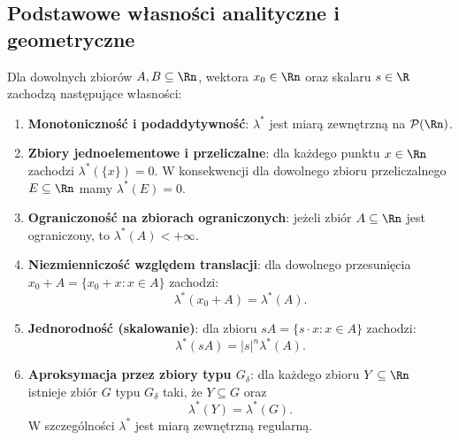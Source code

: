 \subsection{Podstawowe własności analityczne i geometryczne} \begin{tw}
    Dla dowolnych zbiorów $A, B \subseteq \Rn$, wektora $x_0 \in \Rn$ oraz skalaru $s \in \R$ zachodzą następujące własności:
    \begin{enumerate}
        \item \textbf{Monotoniczność i podaddytywność}: $\lambda^{*}$ jest miarą zewnętrzną na $\mathcal{P}(\Rn)$.
        \item \textbf{Zbiory jednoelementowe i przeliczalne}: dla każdego punktu $x \in \Rn$ zachodzi $\lambda^{*}(\{x\}) = 0$. W konsekwencji dla dowolnego zbioru przeliczalnego $E \subseteq \Rn$ mamy $\lambda^{*}(E) = 0$.
        \item \textbf{Ograniczoność na zbiorach ograniczonych}: jeżeli zbiór $A \subseteq \Rn$ jest ograniczony, to $\lambda^{*}(A) < +\infty$.

        \item \textbf{Niezmienniczość względem translacji}: dla dowolnego przesunięcia $x_0 + A = \{x_0 + x \colon x \in A\}$ zachodzi:
              \begin{equation*}
                  \lambda^{*}(x_0 + A) = \lambda^{*}(A).
              \end{equation*}
        \item \textbf{Jednorodność (skalowanie)}: dla zbioru $sA = \{s \cdot x \colon x \in A\}$ zachodzi:
              \begin{equation*}
                  \lambda^{*}(sA) = |s|^n \lambda^{*}(A).
              \end{equation*}
        \item \textbf{Aproksymacja przez zbiory typu $G_\delta$}: dla każdego zbioru $Y \subseteq \Rn$ istnieje zbiór $G$ typu $G_\delta$ taki, że $Y \subseteq G$ oraz
              \begin{equation*}
                  \lambda^{*}(Y) = \lambda^{*}(G).
              \end{equation*}
              W szczególności $\lambda^{*}$ jest miarą zewnętrzną regularną. \end{enumerate}
\end{tw}
